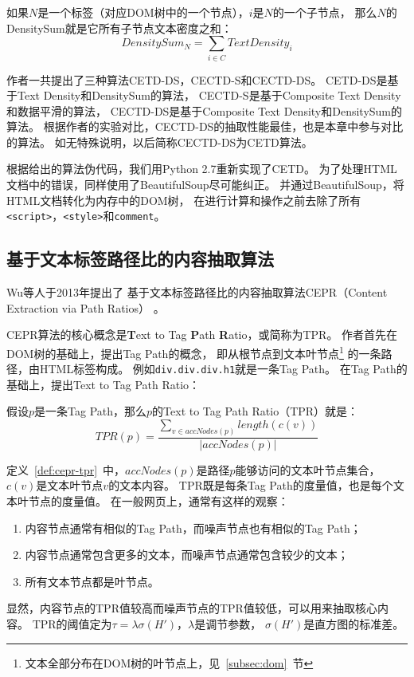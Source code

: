 \begin{definition}
\label{def:cetd-densitysum}
如果$N$是一个标签（对应DOM树中的一个节点），$i$是$N$的一个子节点，
那么$N$的DensitySum就是它所有子节点文本密度之和：
\begin{equation}
DensitySum_N = \sum_{i \in C} TextDensity_i
\end{equation}
\end{definition}

作者一共提出了三种算法CETD-DS，CECTD-S和CECTD-DS。
CETD-DS是基于Text Density和DensitySum的算法，
CECTD-S是基于Composite Text Density和数据平滑的算法，
CECTD-DS是基于Composite Text Density和DensitySum的算法。
根据作者的实验对比，CECTD-DS的抽取性能最佳，也是本章中参与对比的算法。
如无特殊说明，以后简称CECTD-DS为CETD算法。

根据\cite{sun2011dom}给出的算法伪代码，我们用Python 2.7重新实现了CETD。
为了处理HTML文档中的错误，同样使用了BeautifulSoup尽可能纠正。
并通过BeautifulSoup，将HTML文档转化为内存中的DOM树，
在进行计算和操作之前去除了所有\texttt{<script>}，\texttt{<style>}和\texttt{comment}。

\subsection{基于文本标签路径比的内容抽取算法}
Wu等人于2013年提出了
基于文本标签路径比的内容抽取算法CEPR（Content Extraction via Path Ratios）
。

CEPR算法的核心概念是\textbf{T}ext to Tag \textbf{P}ath \textbf{R}atio，或简称为TPR。
作者首先在DOM树的基础上，提出Tag Path的概念，
即从根节点到文本叶节点\footnote{文本全部分布在DOM树的叶节点上，见~\ref{subsec:dom}~节}
的一条路径，由HTML标签构成。
例如\texttt{div.div.div.h1}就是一条Tag Path。
在Tag Path的基础上，提出Text to Tag Path Ratio：

\begin{definition}
\label{def:cepr-tpr}
假设$p$是一条Tag Path，那么$p$的Text to Tag Path Ratio（TPR）就是：
\begin{equation}
TPR(p) = \frac{\sum_{v \in accNodes(p)}length(c(v))}{\vert accNodes(p) \vert}
\end{equation}
\end{definition}

定义~\ref{def:cepr-tpr}~中，$accNodes(p)$是路径$p$能够访问的文本叶节点集合，
$c(v)$是文本叶节点$v$的文本内容。
TPR既是每条Tag Path的度量值，也是每个文本叶节点的度量值。
在一般网页上，通常有这样的观察：
\begin{enumerate}
\item 内容节点通常有相似的Tag Path，而噪声节点也有相似的Tag Path；
\item 内容节点通常包含更多的文本，而噪声节点通常包含较少的文本；
\item 所有文本节点都是叶节点。
\end{enumerate}
显然，内容节点的TPR值较高而噪声节点的TPR值较低，可以用来抽取核心内容。
TPR的阈值定为$\tau = \lambda \sigma(H')$，$\lambda$是调节参数，
$\sigma(H')$是直方图的标准差。

